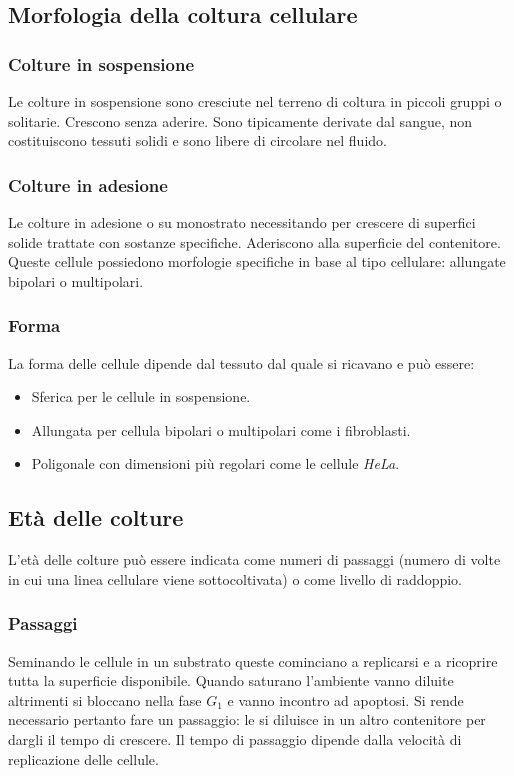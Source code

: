 	\subsection{Morfologia della coltura cellulare}

		\subsubsection{Colture in sospensione}
		Le colture in sospensione sono cresciute nel terreno di coltura in piccoli gruppi o solitarie.
		Crescono senza aderire.
		Sono tipicamente derivate dal sangue, non costituiscono tessuti solidi e sono libere di circolare nel fluido.

		\subsubsection{Colture in adesione}
		Le colture in adesione o su monostrato necessitando per crescere di superfici solide trattate con sostanze specifiche.
		Aderiscono alla superficie del contenitore.
		Queste cellule possiedono morfologie specifiche in base al tipo cellulare: allungate bipolari o multipolari. 
		
		\subsubsection{Forma}
		La forma delle cellule dipende dal tessuto dal quale si ricavano e pu\`o essere:
		\begin{multicols}{2}
		\begin{itemize}
			\item Sferica per le cellule in sospensione.
			\item Allungata per cellula bipolari o multipolari come i fibroblasti.
			\item Poligonale con dimensioni pi\`u regolari come le cellule \emph{HeLa}.
		\end{itemize}
	\end{multicols}

	\subsection{Et\`a delle colture}
	L'et\`a delle colture pu\`o essere indicata come numeri di passaggi (numero di volte in cui una linea cellulare viene sottocoltivata) o come livello di raddoppio.

		\subsubsection{Passaggi}
		Seminando le cellule in un substrato queste cominciano a replicarsi e a ricoprire tutta la superficie disponibile.
		Quando saturano l'ambiente vanno diluite altrimenti si bloccano nella fase $G_1$ e vanno incontro ad apoptosi. 
		Si rende necessario pertanto fare un passaggio: le si diluisce in un altro contenitore per dargli il tempo di crescere.
		Il tempo di passaggio dipende dalla velocit\`a di replicazione delle cellule. 

